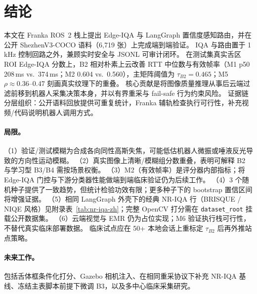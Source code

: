 \section{结论}
\label{sec:conclusion-zh}

本文在 Franka ROS~2 栈上提出 Edge-IQA 与 LangGraph 置信度感知路由，并在公开 ShezhenV3-COCO 语料（6{,}719 张）上完成端到端验证。
IQA 与路由置于 1\,kHz 控制回路之外，兼顾实时安全与 JSONL 可审计闭环。
在测试集真实舌区 ROI Edge-IQA 分数上，B2 相对朴素上云改善 RTT 中位数与有效帧率（M1 p50 208\,ms vs.\ 374\,ms；M2 0.604 vs.\ 0.560），主矩阵阈值为 $\tau_{B2}{=}0.465$；M5 $\rho{\approx}0.36$--$0.47$ 刻画真实纹理下的重叠。
核心贡献是将图像质量推理从事后云端过滤前移到机器人采集决策本身，并以有界重采与 fail-safe 行为约束风险。
证据链分层组织：公开语料回放提供可重复统计，Franka 辅轨检查执行可行性，补充视频/代码说明机器人调用方式。

\paragraph{局限。}
（1）验证/测试模糊为合成各向同性高斯失焦，可能低估机器人微振或唾液反光导致的方向性运动模糊。
（2）真实图像上清晰/模糊组分数重叠，表明可解释 B2 与学习型 B3/B4 需按场景权衡。
（3）M2（有效帧率）是评分器内部指标；将 Edge-IQA 门控与下游分类器性能做端到端临床验证仍为后续工作。
（4）3 个随机种子提供了一致趋势，但统计检验功效有限；更多种子下的 bootstrap 置信区间将增强证据。
（5）相同 LangGraph 外壳下的经典 NR-IQA 行（BRISQUE / NIQE 风格）见附录表~\ref{tab:nr-iqa-zh}；完整 OpenCV 打分需在 \texttt{dataset\_root} 挂载公开数据集。
（6）云端视觉与 EMR 仍为占位实现；M6 验证执行栈可行性，不替代真实临床部署数据。
临床试点应在 50+ 本地会话上重标定 $\tau_{B2}$ 后再外推站点策略。

\paragraph{未来工作。}
包括舌体框条件化打分、Gazebo 相机注入、在相同重采协议下补充 NR-IQA 基线、冻结主表脚本前提下微调 B3，以及多中心临床采集研究。
